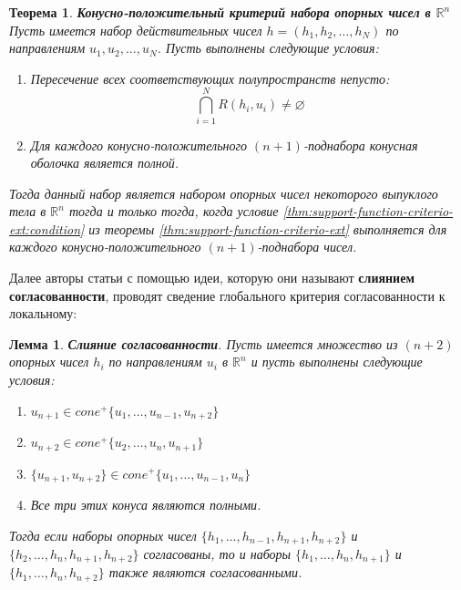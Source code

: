 \documentclass[a4paper, 12pt, titlepage]{article}
\theoremstyle{definition}
\theoremstyle{plain}
\newtheorem{SmartTheorem}{Теорема}
\theoremstyle{plain}
\newtheorem{SmartLemma}{Лемма}
\begin{document}
\begin{SmartTheorem}
 \label{thm:positive-cone-consistency}
 \textbf{Конусно-положительный критерий набора опорных чисел в $\mathbb{R}^{n}$}
 Пусть имеется набор действительных чисел $h = (h_{1}, h_{2}, \ldots, h_{N})$ по
 направлениям $u_{1}, u_{2}, \ldots, u_{N}$. Пусть выполнены следующие 
 условия:
 \begin{enumerate}
  \item Пересечение всех соответствующих полупространств непусто:
  \begin{equation}
   \bigcap \limits_{i = 1}^{N} R(h_{i}, u_{i}) \neq \varnothing
  \end{equation}
  \item Для каждого конусно-положительного $(n + 1)$-поднабора конусная оболочка
  является полной.
 \end{enumerate}

 Тогда данный набор является набором опорных чисел некоторого выпуклого тела в 
 $\mathbb{R}^{n}$ тогда и только тогда, когда условие 
 \ref{thm:support-function-criterio-ext:condition} из теоремы
 \ref{thm:support-function-criterio-ext} выполняется для каждого 
 конусно-положительного $(n + 1)$-поднабора чисел.
\end{SmartTheorem}

Далее авторы статьи с помощью идеи, которую они называют \textbf{слиянием 
согласованности}, проводят сведение глобального критерия согласованности к 
локальному:

\begin{SmartLemma}
 \label{lem:consistency-merging}
 \textbf{Слияние согласованности}.
 Пусть имеется множество из $(n + 2)$ опорных чисел $h_{i}$ по направлениям 
 $u_{i}$ в $\mathbb{R}^{n}$ и пусть выполнены следующие условия:
 
 \begin{enumerate}
  \item $u_{n + 1} \in cone^{+}\{u_{1}, \ldots, u_{n - 1}, u_{n + 2}\}$
  \item $u_{n + 2} \in cone^{+}\{u_{2}, \ldots, u_{n}, u_{n + 1}\}$
  \item $\{u_{n + 1}, u_{n + 2}\} \in cone^{+}\{u_{1}, \ldots, u_{n - 1},
u_{n}\}$
  \item Все три этих конуса являются полными.
 \end{enumerate}

 Тогда если наборы опорных чисел 
 $\{h_{1}, \ldots, h_{n - 1}, h_{n + 1}, h_{n + 2}\}$ и
 $\{h_{2}, \ldots, h_{n}, h_{n + 1}, h_{n + 2}\}$ согласованы, то и наборы
 $\{h_{1}, \ldots, h_{n}, h_{n + 1}\}$ и
 $\{h_{1}, \ldots, h_{n}, h_{n + 2}\}$ также являются согласованными.
\end{SmartLemma}
\end{document}

